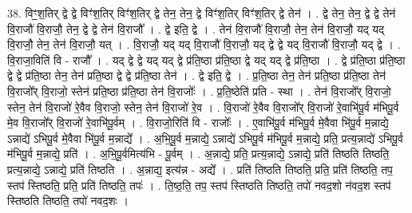 \documentclass[17pt]{extarticle}
\begin{document}
38. विꣳ॒॒श॒तिर् द्वे द्वे विꣳ॑श॒तिर् विꣳ॑श॒तिर् द्वे तेन॒ तेन॒ द्वे विꣳ॑श॒तिर् विꣳ॑श॒तिर् द्वे तेन॑ । . द्वे तेन॒ तेन॒ द्वे द्वे तेन॑ वि॒राजौ॑ वि॒राजौ॒ तेन॒ द्वे द्वे तेन॑ वि॒राजौ᳚ । . द्वे इति॒ द्वे । . तेन॑ वि॒राजौ॑ वि॒राजौ॒ तेन॒ तेन॑ वि॒राजौ॒ यद् यद् वि॒राजौ॒ तेन॒ तेन॑ वि॒राजौ॒ यत् । . वि॒राजौ॒ यद् यद् वि॒राजौ॑ वि॒राजौ॒ यद् द्वे द्वे यद् वि॒राजौ॑ वि॒राजौ॒ यद् द्वे । . वि॒राजा॒विति॑ वि - राजौ᳚ । . यद् द्वे द्वे यद् यद् द्वे प्र॑ति॒ष्ठा प्र॑ति॒ष्ठा द्वे यद् यद् द्वे प्र॑ति॒ष्ठा । . द्वे प्र॑ति॒ष्ठा प्र॑ति॒ष्ठा द्वे द्वे प्र॑ति॒ष्ठा तेन॒ तेन॑ प्रति॒ष्ठा द्वे द्वे प्र॑ति॒ष्ठा तेन॑ । . द्वे इति॒ द्वे । . प्र॒ति॒ष्ठा तेन॒ तेन॑ प्रति॒ष्ठा प्र॑ति॒ष्ठा तेन॑ वि॒राजो᳚र् वि॒राजो॒ स्तेन॑ प्रति॒ष्ठा प्र॑ति॒ष्ठा तेन॑ वि॒राजोः᳚ । . प्र॒ति॒ष्ठेति॑ प्रति - स्था । . तेन॑ वि॒राजो᳚र् वि॒राजो॒ स्तेन॒ तेन॑ वि॒राजो॑ रे॒वैव वि॒राजो॒ स्तेन॒ तेन॑ वि॒राजो॑ रे॒व । . वि॒राजो॑ रे॒वैव वि॒राजो᳚र् वि॒राजो॑ रे॒वाभि॑पू॒र्व म॑भिपू॒र्व मे॒व वि॒राजो᳚र् वि॒राजो॑ रे॒वाभि॑पू॒र्वम् । . वि॒राजो॒रिति॑ वि - राजोः᳚ । . ए॒वाभि॑पू॒र्व म॑भिपू॒र्व मे॒वैवा भि॑पू॒र्व म॒न्नाद्ये॒ ऽन्नाद्ये॑ ऽभिपू॒र्व मे॒वैवा भि॑पू॒र्व म॒न्नाद्ये᳚ । . अ॒भि॒पू॒र्व म॒न्नाद्ये॒ ऽन्नाद्ये॑ ऽभिपू॒र्व म॑भिपू॒र्व म॒न्नाद्ये॒ प्रति॒ प्रत्य॒न्नाद्ये॑ ऽभिपू॒र्व म॑भिपू॒र्व म॒न्नाद्ये॒ प्रति॑ । . अ॒भि॒पू॒र्वमित्य॑भि - पू॒र्वम् । . अ॒न्नाद्ये॒ प्रति॒ प्रत्य॒न्नाद्ये॒ ऽन्नाद्ये॒ प्रति॑ तिष्ठति तिष्ठति॒ प्रत्य॒न्नाद्ये॒ ऽन्नाद्ये॒ प्रति॑ तिष्ठति । . अ॒न्नाद्य॒ इत्य॑न्न - अद्ये᳚ । . प्रति॑ तिष्ठति तिष्ठति॒ प्रति॒ प्रति॑ तिष्ठति॒ तप॒ स्तप॑ स्तिष्ठति॒ प्रति॒ प्रति॑ तिष्ठति॒ तपः॑ । . ति॒ष्ठ॒ति॒ तप॒ स्तप॑ स्तिष्ठति तिष्ठति॒ तपो॑ नवद॒शो न॑वद॒श स्तप॑ स्तिष्ठति तिष्ठति॒ तपो॑ नवद॒शः । \newline
\end{document}

